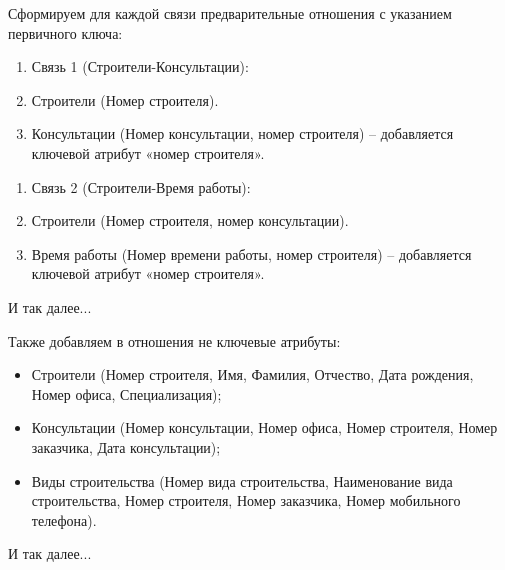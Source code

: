 \documentclass{../SIBGU-state}
\begin{document}
Сформируем для каждой связи предварительные отношения с указанием первичного ключа: \par
\begin{enumerate}[label=\asbuk*), ref=\asbuk*]
    \item[] Связь 1 (Строители-Консультации):
	\item Строители (Номер строителя).
	\item Консультации (Номер консультации, номер строителя) – добавляется ключевой атрибут «номер строителя».
\end{enumerate}\par\bigskip
\begin{enumerate}[label=\asbuk*), ref=\asbuk*]
    \item[] Связь 2 (Строители-Время работы):
	\item Строители (Номер строителя, номер консультации).
	\item Время работы (Номер времени работы, номер строителя) – добавляется ключевой атрибут «номер строителя».
\end{enumerate}\par\bigskip
И так далее...\par\bigskip
Также добавляем в отношения не ключевые атрибуты:\par
\begin{itemize}
	\item Строители (Номер строителя, Имя, Фамилия, Отчество, Дата рождения, Номер офиса, Специализация);
	\item Консультации (Номер консультации, Номер офиса, Номер строителя, Номер заказчика, Дата консультации);
    \item Виды строительства (Номер вида строительства, Наименование вида строительства, Номер строителя, Номер заказчика, Номер мобильного телефона).
\end{itemize}\par\bigskip
И так далее...\par\bigskip
\end{document}
